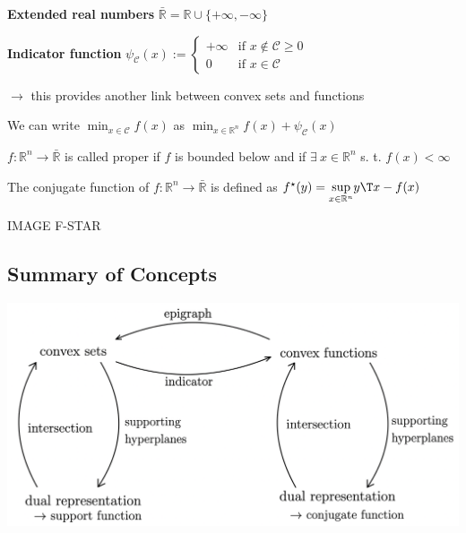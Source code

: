 \textbf{Extended real numbers} $\bar{\mathbb{R}} = \mathbb{R} \cup \{+\infty, -\infty\}$


\textbf{Indicator function}
$\psi_\mathcal{C}(x) := \begin{cases} +\infty &\text{if } x \notin\mathcal{C} \ge 0 \\ 0 &\text{if } x \in\mathcal{C} \end{cases}$

$\rightarrow$ this provides another link between convex sets and functions

We can write
$\min_{x \in \mathcal{C}}f(x)$ as
$\min_{x \in \mathbb{R}^{n}}f(x) + \psi_\mathcal{C}(x)$

\begin{definition}[3]
	$f: \mathbb{R}^{n}\rightarrow\bar{\mathbb{R}}$ is called proper
	if $f$ is bounded below and
	if $\exists\ x \in \mathbb{R}^{n}$ s. t. $f(x)<\infty$
\end{definition}

\begin{definition}
	The conjugate function of $f: \mathbb{R}^{n}\rightarrow\bar{\mathbb{R}}$  is defined as
	$f^\star(y)=\underset{x \in \mathbb{R}^{n}}{\operatorname{sup}}y\T x-f(x)$
\end{definition}

IMAGE F-STAR

\subsection{Summary of Concepts}


\includegraphics[width=\columnwidth]{images/summary_set_functions.png}

\begin{theorem}[THEOREM2?]

\end{theorem}
